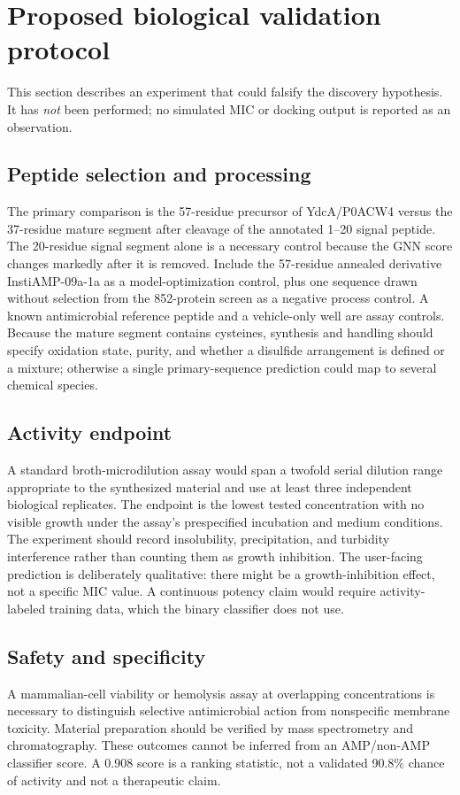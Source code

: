 \section{Proposed biological validation protocol}
\label{sec:wetlab}
This section describes an experiment that could falsify the discovery
hypothesis. It has \emph{not} been performed; no simulated MIC or docking
output is reported as an observation.

\subsection{Peptide selection and processing}
The primary comparison is the 57-residue precursor of YdcA/P0ACW4 versus
the 37-residue mature segment after cleavage of the annotated 1--20 signal
peptide. The 20-residue signal segment alone is a necessary control because
the GNN score changes markedly after it is removed. Include the 57-residue
annealed derivative InstiAMP-09a-1a as a model-optimization control, plus
one sequence drawn without selection from the 852-protein screen as a
negative process control. A known antimicrobial reference peptide and a
vehicle-only well are assay controls. Because the mature segment contains
cysteines, synthesis and handling should specify oxidation state, purity,
and whether a disulfide arrangement is defined or a mixture; otherwise a
single primary-sequence prediction could map to several chemical species.

\subsection{Activity endpoint}
A standard broth-microdilution assay would span a twofold serial dilution
range appropriate to the synthesized material and use at least three
independent biological replicates. The endpoint is the lowest tested
concentration with no visible growth under the assay's prespecified
incubation and medium conditions. The experiment should record insolubility,
precipitation, and turbidity interference rather than counting them as
growth inhibition. The user-facing prediction is deliberately qualitative:
there might be a growth-inhibition effect, not a specific MIC value. A
continuous potency claim would require activity-labeled training data,
which the binary classifier does not use.

\subsection{Safety and specificity}
A mammalian-cell viability or hemolysis assay at overlapping concentrations
is necessary to distinguish selective antimicrobial action from nonspecific
membrane toxicity. Material preparation should be verified by mass
spectrometry and chromatography. These outcomes cannot be inferred from an
AMP/non-AMP classifier score. A 0.908 score is a ranking statistic, not a
validated 90.8\% chance of activity and not a therapeutic claim.

